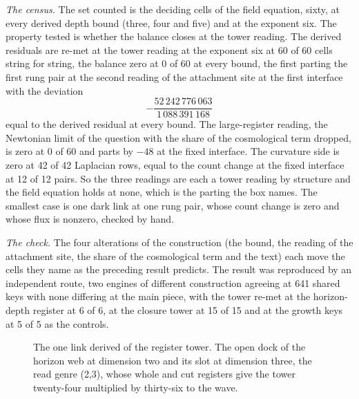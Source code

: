 \begin{chproof}
\textit{The census.} The set counted is the deciding cells of the field equation, sixty, at every derived depth bound (three, four and five) and at the exponent six. The property tested is whether the balance closes at the tower reading. The derived residuals are re-met at the tower reading at the exponent six at 60 of 60 cells string for string, the balance zero at 0 of 60 at every bound, the first parting the first rung pair at the second reading of the attachment site at the first interface with the deviation
\begin{equation}
-\frac{52\,242\,776\,063}{1\,088\,391\,168}
\end{equation}
equal to the derived residual at every bound. The large-register reading, the Newtonian limit of the question with the share of the cosmological term dropped, is zero at 0 of 60 and parts by $-48$ at the fixed interface. The curvature side is zero at 42 of 42 Laplacian rows, equal to the count change at the fixed interface at 12 of 12 pairs. So the three readings are each a tower reading by structure and the field equation holds at none, which is the parting the box names. The smallest case is one dark link at one rung pair, whose count change is zero and whose flux is nonzero, checked by hand.

\textit{The check.} The four alterations of the construction (the bound, the reading of the attachment site, the share of the cosmological term and the text) each move the cells they name as the preceding result predicts. The result was reproduced by an independent route, two engines of different construction agreeing at 641 shared keys with none differing at the main piece, with the tower re-met at the horizon-depth register at 6 of 6, at the closure tower at 15 of 15 and at the growth keys at 5 of 5 as the controls.
\end{chproof}
\begin{figure}[h]
\centering
{}
\caption{The one link derived of the register tower. The open dock of the horizon web at dimension two and its slot at dimension three, the read genre (2,3), whose whole and cut registers give the tower twenty-four multiplied by thirty-six to the wave.}
\end{figure}
\par\medskip{}\label{narr:close:10-10}\par

